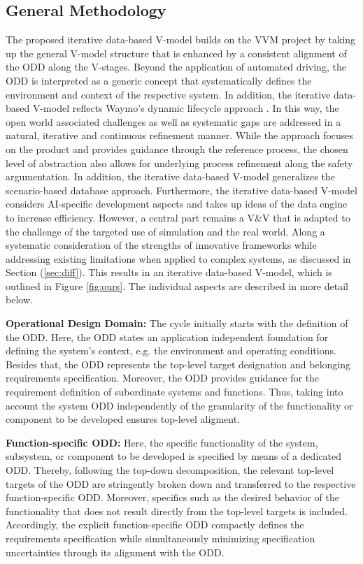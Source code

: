\subsection{General Methodology}\label{sec:methodo}
The proposed iterative data-based V-model builds on the VVM \cite{VVM} project by taking up the general V-model structure that is enhanced by a consistent alignment of the ODD along the V-stages. Beyond the application of automated driving, the ODD is interpreted as a generic concept that systematically defines the environment and context of the respective system. In addition, the iterative data-based V-model reflects Waymo's dynamic lifecycle approach \cite{favaro2023building}. In this way, the open world associated challenges as well as systematic gaps are addressed in a natural, iterative and continuous refinement manner. While the approach focuses on the product and provides guidance through the reference process, the chosen level of abstraction also allows for underlying process refinement along the safety argumentation. In addition, the iterative data-based V-model generalizes the scenario-based database approach. Furthermore, the iterative data-based V-model considers AI-specific development aspects and takes up ideas of the data engine \cite{karpathy_cvpr21} to increase efficiency. However, a central part remains a V\&V that is adapted to the challenge of the targeted use of simulation and the real world. Along a systematic consideration of the strengths of innovative frameworks while addressing existing limitations when applied to complex systems, as discussed in Section (\ref{sec:diff}). This results in an iterative data-based V-model, which is outlined in Figure \ref{fig:ours}. The individual aspects are described in more detail below. 

\textbf{Operational Design Domain:} The cycle initially starts with the definition of the ODD. Here, the ODD states an application independent foundation for defining the system's context, e.g. the environment and operating conditions. Besides that, the ODD represents the top-level target designation and belonging requirements specification. Moreover, the ODD provides guidance for the requirement definition of subordinate systems and functions. Thus, taking into account the system ODD independently of the granularity of the functionality or component to be developed ensures top-level aligment.

\textbf{Function-specific ODD:} Here, the specific functionality of the system, subsystem, or component to be developed is specified by means of a dedicated ODD. Thereby, following the top-down decomposition, the relevant top-level targets of the ODD are stringently broken down and transferred to the respective function-specific ODD. Moreover, specifics such as the desired behavior of the functionality that does not result directly from the top-level targets is included. Accordingly, the explicit function-specific ODD compactly defines the requirements specification while simultaneously minimizing specification uncertainties \cite{burton2023closing} through its alignment with the ODD.

